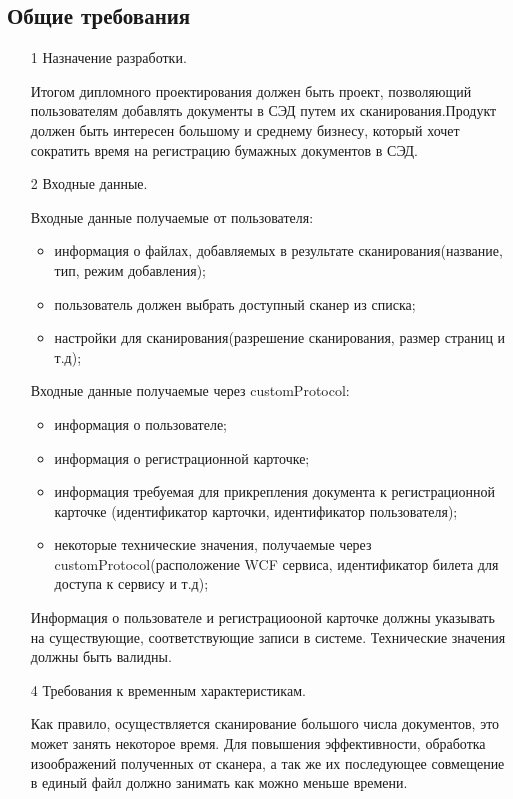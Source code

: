 \subsection{Общие требования}


\begin{itemize}
  \item[1] Назначение разработки.

\hspace*{2.5em}Итогом дипломного проектирования должен быть проект, позволяющий пользователям добавлять документы в СЭД путем их сканирования.Продукт должен быть интересен большому и среднему бизнесу, который хочет сократить время на регистрацию бумажных документов в СЭД.

  \item[2] Входные данные.

	Входные данные получаемые от пользователя:
  \begin{itemize}
  	\item информация о файлах, добавляемых в результате сканирования(название, тип, режим добавления);
  	\item пользователь должен выбрать доступный сканер из списка;
  	\item настройки для сканирования(разрешение сканирования, размер страниц и т.д);
  \end{itemize}

  Входные данные получаемые через customProtocol:
  \begin{itemize}
  	\item информация о пользователе; 
  	\item информация о регистрационной карточке;
   	\item информация требуемая для прикрепления документа к регистрационной карточке (идентификатор карточки, идентификатор пользователя);
  	\item некоторые технические значения, получаемые через customProtocol(расположение WCF сервиса, идентификатор билета для доступа к сервису и т.д); 	
  \end{itemize}

  \hspace*{2.5em}Информация о пользователе и регистрациооной карточке должны указывать на существующие, соответствующие записи в системе. Технические значения должны быть валидны.
 
  \item[4] Требования к временным характеристикам.

\hspace*{2.5em}Как правило, осуществляется сканирование большого числа документов, это может занять некоторое время. Для повышения эффективности, обработка изоображений полученных от сканера, а так же их последующее совмещение в единый файл должно занимать как можно меньше времени. 


\end{itemize}
